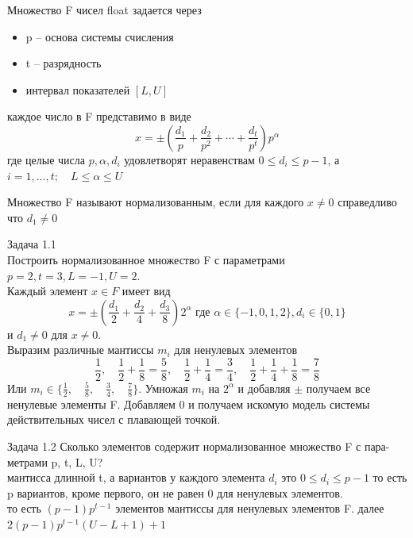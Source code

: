 \documentclass{article}
\begin{document}
Множество F чисел float задается через
\begin{itemize}
  \item p -- основа системы счисления
  \item t -- разрядность
  \item интервал показателей $[L,U]$
\end{itemize}
каждое число в F представимо в виде \[
  x = \pm(\frac{d_1}{p}+\frac{d_2}{p^2}+\cdots+\frac{d_t}{p^t})p^\alpha
\] 
где целые числа $p,\alpha,d_i$ удовлетворят неравенствам $0\leq d_i
\leq p-1$, а $i=1,\ldots,t;\quad L\leq \alpha\leq U$

Множество F называют нормализованным, если для каждого $x\neq 0$ 
справедливо что $d_1\neq 0$

Задача 1.1\\
Построить нормализованное множество F с параметрами $p = 2,
t = 3, L = −1, U = 2$.\\
Каждый элемент $x\in F$ имеет вид \[
  x = \pm(\frac{d_1}{2}+\frac{d_2}{4}+\frac{d_3}{8})2^\alpha
  \text{ где } \alpha\in \{-1,0,1,2\}, d_i\in \{0,1\}
\] 
и $d_1\neq 0$ для $x\neq 0$.\\
Выразим различные мантиссы $m_i$ для ненулевых элементов \[
  \frac{1}{2},\quad\frac{1}{2}+\frac{1}{8}=\frac{5}{8},
  \quad\frac{1}{2}+\frac{1}{4}=\frac{3}{4},
  \quad\frac{1}{2}+\frac{1}{4}+\frac{1}{8}=\frac{7}{8}
\] 
Или $m_i\in \{\frac{1}{2},\quad \frac{5}{8},\quad 
\frac{3}{4},\quad \frac{7}{8}\}$. Умножая $m_i$ на $2^\alpha$ и 
добавляя $\pm$ получаем все ненулевые элементы F.
Добавляем 0 и получаем искомую модель системы
действительных чисел с плавающей точкой.

Задача 1.2
Сколько элементов содержит нормализованное множество F с пара-
метрами p, t, L, U?\\
мантисса длинной t, а вариантов у каждого элемента $d_i$ это
$0\leq d_i\leq p-1$ то есть p вариантов, кроме первого, он не
равен 0 для ненулевых элементов.\\
то есть $(p-1)p^{t-1}$ элементов мантиссы для ненулевых элементов F.
далее $2(p-1)p^{t-1}(U-L+1) + 1$
\end{document}
